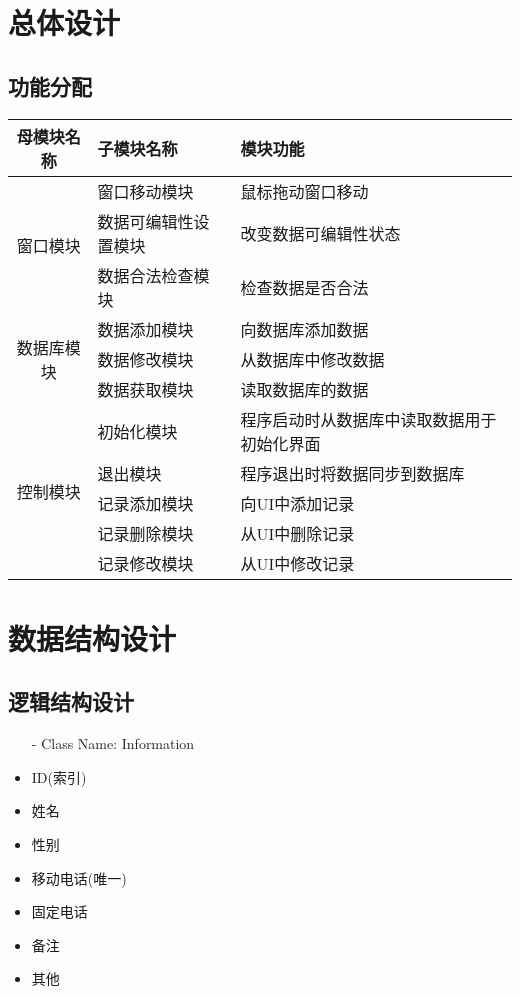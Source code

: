 \section{总体设计}
	\subsection{功能分配}
		\begin{tabular}{|c|l|l|}
			\hline
			母模块名称& 子模块名称 & 模块功能 \\
			\hline 
			\multirow{3}{*}{ 窗口模块}
			& 窗口移动模块 & 鼠标拖动窗口移动 \\
			\cline{2-3}
			& 数据可编辑性设置模块 & 改变数据可编辑性状态 \\
			\cline{2-3}
			& 数据合法检查模块 & 检查数据是否合法 \\
			\hline
			\multirow{3}{*}{
			数据库模块} 
			& 数据添加模块 & 向数据库添加数据 \\
			\cline{2-3}
			& 数据修改模块 & 从数据库中修改数据 \\
			\cline{2-3}
			& 数据获取模块 & 读取数据库的数据 \\
			\hline
			\multirow{5}{*}{控制模块}
			& 初始化模块 & 程序启动时从数据库中读取数据用于初始化界面 \\
			\cline{2-3}
			& 退出模块 & 程序退出时将数据同步到数据库 \\
			\cline{2-3}
			& 记录添加模块 & 向UI中添加记录 \\
			\cline{2-3}
			& 记录删除模块 & 从UI中删除记录 \\
			\cline{2-3}
			& 记录修改模块 & 从UI中修改记录 \\
			\hline
		\end{tabular}
\section{数据结构设计}
	\subsection{逻辑结构设计}
		\begin{itemize}
			\item[-] Class Name: Information
			\item ID(索引)
			\item 姓名
			\item 性别
			\item 移动电话(唯一)
			\item 固定电话
			\item 备注
			\item 其他
		\end{itemize}
